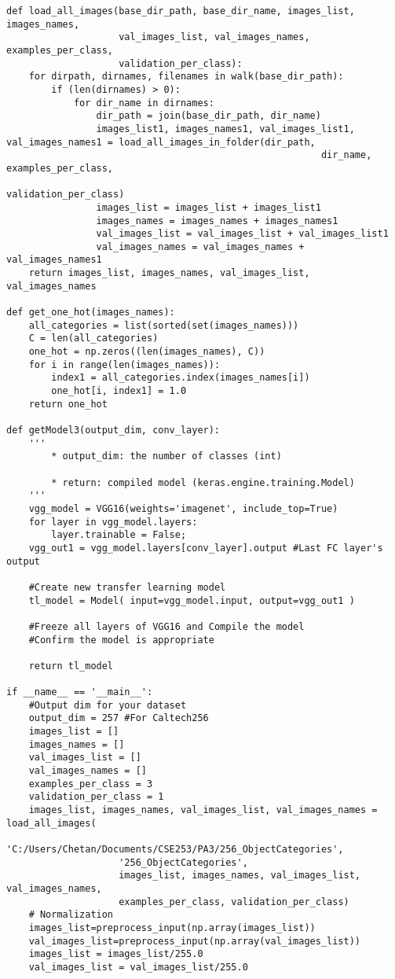 \documentclass{article}
\begin{document}
\begin{lstlisting}
def load_all_images(base_dir_path, base_dir_name, images_list, images_names, 
                    val_images_list, val_images_names, examples_per_class, 
                    validation_per_class):
    for dirpath, dirnames, filenames in walk(base_dir_path):
        if (len(dirnames) > 0):
            for dir_name in dirnames:
                dir_path = join(base_dir_path, dir_name)
                images_list1, images_names1, val_images_list1, val_images_names1 = load_all_images_in_folder(dir_path, 
                                                        dir_name, examples_per_class, 
                                                        validation_per_class)
                images_list = images_list + images_list1
                images_names = images_names + images_names1
                val_images_list = val_images_list + val_images_list1
                val_images_names = val_images_names + val_images_names1
    return images_list, images_names, val_images_list, val_images_names    
       
def get_one_hot(images_names):
    all_categories = list(sorted(set(images_names)))
    C = len(all_categories)    
    one_hot = np.zeros((len(images_names), C))
    for i in range(len(images_names)):
        index1 = all_categories.index(images_names[i])
        one_hot[i, index1] = 1.0
    return one_hot    
    
def getModel3(output_dim, conv_layer):
    '''
        * output_dim: the number of classes (int)
       
        * return: compiled model (keras.engine.training.Model)
    '''
    vgg_model = VGG16(weights='imagenet', include_top=True)
    for layer in vgg_model.layers:
        layer.trainable = False;
    vgg_out1 = vgg_model.layers[conv_layer].output #Last FC layer's output 
    
    #Create new transfer learning model
    tl_model = Model( input=vgg_model.input, output=vgg_out1 )

    #Freeze all layers of VGG16 and Compile the model
    #Confirm the model is appropriate

    return tl_model

if __name__ == '__main__':
    #Output dim for your dataset
    output_dim = 257 #For Caltech256
    images_list = []
    images_names = []
    val_images_list = []
    val_images_names = []
    examples_per_class = 3
    validation_per_class = 1
    images_list, images_names, val_images_list, val_images_names = load_all_images(
                    'C:/Users/Chetan/Documents/CSE253/PA3/256_ObjectCategories',
                    '256_ObjectCategories',
                    images_list, images_names, val_images_list, val_images_names, 
                    examples_per_class, validation_per_class)
    # Normalization
    images_list=preprocess_input(np.array(images_list))
    val_images_list=preprocess_input(np.array(val_images_list))
    images_list = images_list/255.0
    val_images_list = val_images_list/255.0
    

\end{lstlisting}
\end{document}
